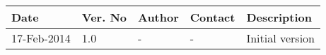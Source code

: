 \begin{center}
    \begin{tabular}{ | l | p{1cm} | l | l | p{5cm} |}
    \hline
    Date&Ver. No & Author &Contact &Description\\ \hline
	17-Feb-2014&1.0 & - & - & Initial version\\
    \hline
    \end{tabular}
\end{center}